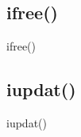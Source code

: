 \documentclass{beamer}
\begin{document}


\subsection{ifree()}

\begin{frame}{ifree()}
\end{frame}




\subsection{iupdat()}

\begin{frame}{iupdat()}
\end{frame}
\end{document}
